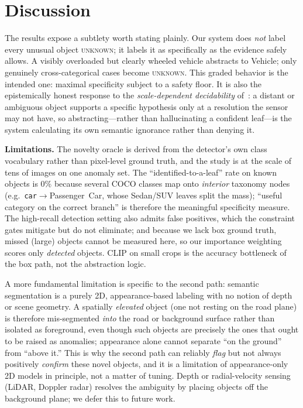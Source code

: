 \documentclass[conference]{IEEEtran}
\begin{document}
\section{Discussion}
\label{sec:discussion}

The results expose a subtlety worth stating plainly. Our system does \emph{not}
label every unusual object \textsc{unknown}; it labels it as specifically as the
evidence safely allows. A visibly overloaded but clearly wheeled vehicle
abstracts to \textsf{Vehicle}; only genuinely cross-categorical cases become
\textsc{unknown}. This graded behavior is the intended one: maximal specificity
subject to a safety floor. It is also the epistemically honest response to the
\emph{scale-dependent decidability} of~\cite{schaller_patterns}: a distant or
ambiguous object supports a specific hypothesis only at a resolution the sensor
may not have, so abstracting---rather than hallucinating a confident leaf---is the
system calculating its own semantic ignorance rather than denying it.

\textbf{Limitations.} The novelty oracle is derived from the detector's own class
vocabulary rather than pixel-level ground truth, and the study is at the scale of
tens of images on one anomaly set. The ``identified-to-a-leaf'' rate on known
objects is $0\%$ because several COCO classes map onto \emph{interior} taxonomy
nodes (e.g.\ \texttt{car}$\rightarrow$\textsf{Passenger~Car}, whose Sedan/SUV
leaves split the mass); ``useful category on the correct branch'' is therefore
the meaningful specificity measure. The high-recall detection setting also admits
false positives, which the constraint gates mitigate but do not eliminate; and
because we lack box ground truth, missed (large) objects cannot be measured here,
so our importance weighting scores only \emph{detected} objects. CLIP on small
crops is the accuracy bottleneck of the box path, not the abstraction logic.

A more fundamental limitation is specific to the second path: semantic
segmentation is a purely 2D, appearance-based labeling with no notion of depth or
scene geometry. A spatially \emph{elevated} object (one not resting on the road
plane) is therefore mis-segmented \emph{into} the road or background surface
rather than isolated as foreground, even though such objects are precisely the
ones that ought to be raised as anomalies; appearance alone cannot separate ``on
the ground'' from ``above it.'' This is why the second path can reliably
\emph{flag} but not always positively \emph{confirm} these novel objects, and it
is a limitation of appearance-only 2D models in principle, not a matter of
tuning. Depth or radial-velocity sensing (LiDAR, Doppler radar) resolves the
ambiguity by placing objects off the background plane; we defer this to future
work.
\end{document}
